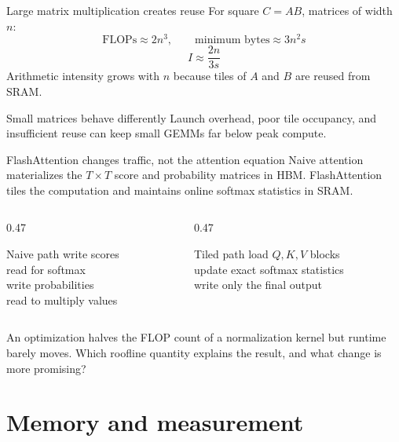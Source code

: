 \documentclass[handout]{beamer}
\begin{document}
\begin{frame}{Large matrix multiplication creates reuse}
  For square $C=AB$, matrices of width $n$:
  \[
    \text{FLOPs}\approx2n^3,\qquad \text{minimum bytes}\approx3n^2s
  \]
  \[
    I\approx\frac{2n}{3s}
  \]
  Arithmetic intensity grows with $n$ because tiles of $A$ and $B$ are reused from SRAM.
  \begin{alertblock}{Small matrices behave differently}
    Launch overhead, poor tile occupancy, and insufficient reuse can keep small GEMMs far below peak compute.
  \end{alertblock}
\end{frame}

\begin{frame}{FlashAttention changes traffic, not the attention equation}
  Naive attention materializes the $T\times T$ score and probability matrices in HBM. FlashAttention tiles the computation and maintains online softmax statistics in SRAM.
  \begin{columns}[t]
    \begin{column}{0.47\linewidth}
      \begin{alertblock}{Naive path}
        write scores\\read for softmax\\write probabilities\\read to multiply values
      \end{alertblock}
    \end{column}
    \begin{column}{0.47\linewidth}
      \begin{block}{Tiled path}
        load $Q,K,V$ blocks\\update exact softmax statistics\\write only the final output
      \end{block}
    \end{column}
  \end{columns}
\end{frame}

  {An optimization halves the FLOP count of a normalization kernel but runtime barely moves. Which roofline quantity explains the result, and what change is more promising?}

\section{Memory and measurement}
\end{document}
